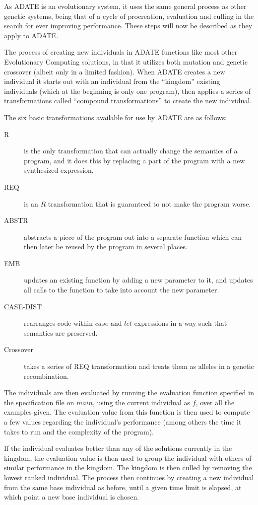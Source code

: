 As ADATE is an evolutionary system, it uses the same general process as other
genetic systems, being that of a cycle of procreation, evaluation and culling in
the search for ever improving performance. These steps will now be described as
they apply to ADATE.

The process of creating new individuals in ADATE functions like most other
Evolutionary Computing solutions, in that it utilizes both mutation and genetic
crossover (albeit only in a limited fashion). When ADATE creates a new
individual it starts out with an individual from the ``kingdom'' existing
individuals (which at the beginning is only one program), then applies a series
of transformations called ``compound transformations'' to create the new
individual.

The six basic transformations available for use by ADATE are as follows:
\begin{description}
\item[R] is the only transformation that can actually change the semantics of a
  program, and it does this by replacing a part of the program with a new
  synthesized expression.
\item[REQ] is an \(R\) transformation that is guaranteed to not make the program
  worse.
\item[ABSTR] abstracts a piece of the program out into a separate function which
  can then later be reused by the program in several places.
\item[EMB] updates an existing function by adding a new parameter to it, and
  updates all calls to the function to take into account the new parameter.
\item[CASE-DIST] rearranges code within \(case\) and \(let\) expressions in a
  way such that semantics are preserved.
\item[Crossover] takes a series of REQ transformation and treats them as alleles
  in a genetic recombination.
\end{description}

The individuals are then evaluated by running the evaluation function specified
in the specification file on \(main\), using the current individual as \(f\),
over all the examples given. The evaluation value from this function is then
used to compute a few values regarding the individual's performance (among others
the time it takes to run and the complexity of the program).

If the individual evaluates better than any of the solutions currently in the
kingdom, the evaluation value is then used to group the individual with others
of similar performance in the kingdom. The kingdom is then culled by removing
the lowest ranked individual. The process then continues by creating a new
individual from the same base individual as before, until a given time limit is
elapsed, at which point a new base individual is chosen.

